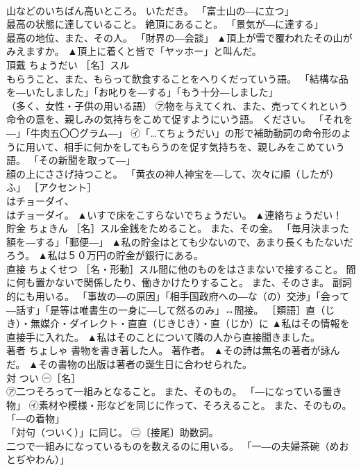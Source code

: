 \documentclass[8pt]{extreport}
\begin{document}
\begin{CJK}{UTF8}{min}
\\	山などのいちばん高いところ。 いただき。 「富士山の―に立つ」 
\\	最高の状態に達していること。 絶頂にあること。 「景気が―に達する」 
\\	最高の地位、また、その人。 「財界の―会談」	▲頂上が雪で覆われたその山がみえますか。 ▲頂上に着くと皆で「ヤッホー」と叫んだ。
\\	頂戴	ちょうだい	［名］スル 
\\	もらうこと、また、もらって飲食することをへりくだっていう語。 「結構な品を―いたしました」「お叱りを―する」「もう十分―しました」 
\\	（多く、女性・子供の用いる語） ㋐物を与えてくれ、また、売ってくれという命令の意を、親しみの気持ちをこめて促すようにいう語。 ください。 「それを―」「牛肉五〇〇グラム―」 ㋑「…てちょうだい」の形で補助動詞の命令形のように用いて、相手に何かをしてもらうのを促す気持ちを、親しみをこめていう語。 「その新聞を取って―」 
\\	顔の上にささげ持つこと。 「黄衣の神人神宝を―して、次々に順（したが）ふ」 ［アクセント］ 
\\	はチョーダイ、 
\\	はチョーダイ。	▲いすで床をこすらないでちょうだい。 ▲連絡ちょうだい！
\\	貯金	ちょきん	［名］スル金銭をためること。 また、その金。 「毎月決まった額を―する」「郵便―」	▲私の貯金はとても少ないので、あまり長くもたないだろう。 ▲私は５０万円の貯金が銀行にある。
\\	直接	ちょくせつ	［名・形動］スル間に他のものをはさまないで接すること。 間に何も置かないで関係したり、働きかけたりすること。 また、そのさま。 副詞的にも用いる。 「事故の―の原因」「相手国政府への―な（の）交渉」「会って―話す」「是等は唯書生の一身に―して然るのみ」↔間接。 ［類語］直（じき）・無媒介・ダイレクト・直直（じきじき）・直（じか）に	▲私はその情報を直接手に入れた。 ▲私はそのことについて隣の人から直接聞きました。
\\	著者	ちょしゃ	書物を書き著した人。 著作者。	▲その詩は無名の著者が詠んだ。 ▲その書物の出版は著者の誕生日に合わせられた。
\\	対	つい	㊀［名］ 
\\	㋐二つそろって一組みとなること。 また、そのもの。 「―になっている置き物」 ㋑素材や模様・形などを同じに作って、そろえること。 また、そのもの。 「―の着物」 
\\	「対句（ついく）」に同じ。 ㊁〔接尾〕助数詞。 
\\	二つで一組みになっているものを数えるのに用いる。 「一―の夫婦茶碗（めおとぢやわん）」 

\end{CJK}
\end{document}
